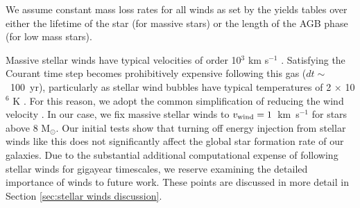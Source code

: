 \documentclass[twocolumn]{aastex61}
\newcommand{\ccunit}{cm$^{-3}$}
\begin{document}
We assume constant mass loss rates for all winds as set by the yields tables over either the lifetime of the star (for massive stars) or the length of the AGB phase (for low mass stars). 

Massive stellar winds have typical velocities of order 10$^{3}$ km s$^{-1}$ \citep{Leitherer1992}. Satisfying the Courant time step becomes prohibitively expensive following this gas ($dt \sim$~100~yr), particularly as stellar wind bubbles have typical temperatures of 2 $\times$ 10$^{6}$ K \citep{Weaver1977}. For this reason, we adopt the common simplification of reducing the wind velocity \citep[e.g][]{Offner2015}. In our case, we fix massive stellar winds to $v_{\rm wind} = 1$~km~s$^{-1}$ for stars above 8 M$_{\odot}$. Our initial tests show that turning off energy injection from stellar winds like this does not significantly affect the global star formation rate of our galaxies. Due to the substantial additional computational expense of following stellar winds for gigayear timescales, we reserve examining the detailed importance of winds to future work. These points are discussed in more detail in Section \ref{sec:stellar winds discussion}.

\end{document}
